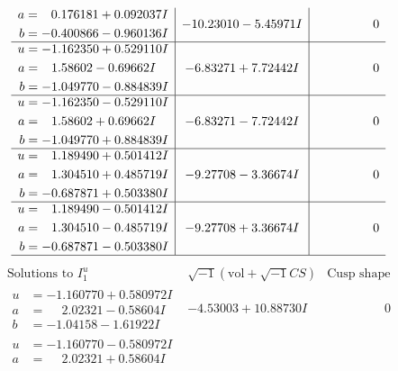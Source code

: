\documentclass[1p]{elsarticle_modified}
\theoremstyle{definition}
\newcommand{\I}{\sqrt{-1}}
\begin{document}
$$\begin{array}{c|c|c}
\begin{aligned}
a &= \phantom{-}0.176181 + 0.092037 I \\
b &= -0.400866 - 0.960136 I\end{aligned}
 & -10.23010 - 5.45971 I & \phantom{-0.000000 } 0 \\ \hline\begin{aligned}
u &= -1.162350 + 0.529110 I \\
a &= \phantom{-}1.58602 - 0.69662 I \\
b &= -1.049770 - 0.884839 I\end{aligned}
 & -6.83271 + 7.72442 I & \phantom{-0.000000 } 0 \\ \hline\begin{aligned}
u &= -1.162350 - 0.529110 I \\
a &= \phantom{-}1.58602 + 0.69662 I \\
b &= -1.049770 + 0.884839 I\end{aligned}
 & -6.83271 - 7.72442 I & \phantom{-0.000000 } 0 \\ \hline\begin{aligned}
u &= \phantom{-}1.189490 + 0.501412 I \\
a &= \phantom{-}1.304510 + 0.485719 I \\
b &= -0.687871 + 0.503380 I\end{aligned}
 & -9.27708 - 3.36674 I & \phantom{-0.000000 } 0 \\ \hline\begin{aligned}
u &= \phantom{-}1.189490 - 0.501412 I \\
a &= \phantom{-}1.304510 - 0.485719 I \\
b &= -0.687871 - 0.503380 I\end{aligned}
 & -9.27708 + 3.36674 I & \phantom{-0.000000 } 0\\
 \hline 
 \end{array}$$\newpage$$\begin{array}{c|c|c}  
\text{Solutions to }I^u_{1}& \I (\text{vol} + \sqrt{-1}CS) & \text{Cusp shape}\\
 \hline 
\begin{aligned}
u &= -1.160770 + 0.580972 I \\
a &= \phantom{-}2.02321 - 0.58604 I \\
b &= -1.04158 - 1.61922 I\end{aligned}
 & -4.53003 + 10.88730 I & \phantom{-0.000000 } 0 \\ \hline\begin{aligned}
u &= -1.160770 - 0.580972 I \\
a &= \phantom{-}2.02321 + 0.58604 I \\

\end{aligned}
\end{array}$$
\end{document}
